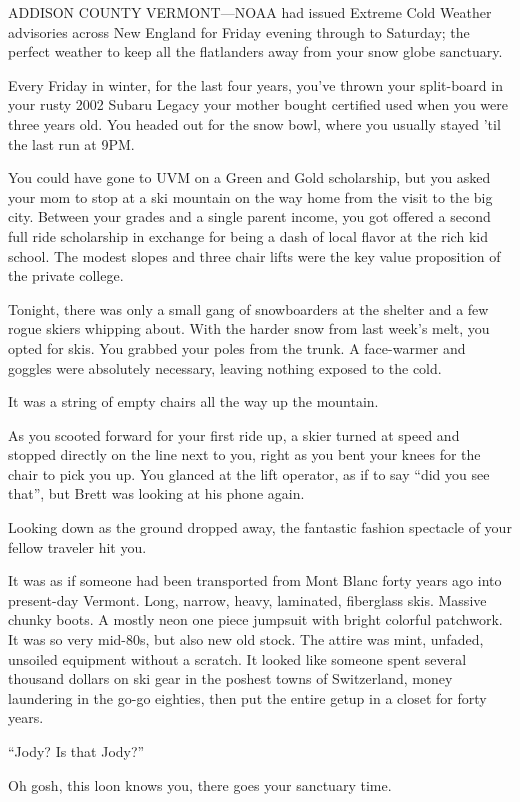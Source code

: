 \documentclass[17pt, twoside, a5paper, openright, extrafontsizes]{memoir}
\begin{document}
ADDISON COUNTY VERMONT---NOAA had issued Extreme Cold Weather advisories
across New England for Friday evening through to Saturday; the perfect
weather to keep all the flatlanders away from your snow globe sanctuary.

Every Friday in winter, for the last four years, you've thrown your
split-board in your rusty 2002 Subaru Legacy your mother bought
certified used when you were three years old. You headed out for the
snow bowl, where you usually stayed 'til the last run at 9PM.

You could have gone to UVM on a Green and Gold scholarship, but you
asked your mom to stop at a ski mountain on the way home from the visit
to the big city. Between your grades and a single parent income, you got
offered a second full ride scholarship in exchange for being a dash of
local flavor at the rich kid school. The modest slopes and three chair
lifts were the key value proposition of the private college.

Tonight, there was only a small gang of snowboarders at the shelter and
a few rogue skiers whipping about. With the harder snow from last week's
melt, you opted for skis. You grabbed your poles from the trunk. A
face-warmer and goggles were absolutely necessary, leaving nothing
exposed to the cold.

It was a string of empty chairs all the way up the mountain.

As you scooted forward for your first ride up, a skier turned at speed
and stopped directly on the line next to you, right as you bent your
knees for the chair to pick you up. You glanced at the lift operator, as
if to say ``did you see that'', but Brett was looking at his phone
again.

Looking down as the ground dropped away, the fantastic fashion spectacle
of your fellow traveler hit you.

It was as if someone had been transported from Mont Blanc forty years
ago into present-day Vermont. Long, narrow, heavy, laminated, fiberglass
skis. Massive chunky boots. A mostly neon one piece jumpsuit with bright
colorful patchwork. It was so very mid-80s, but also new old stock. The
attire was mint, unfaded, unsoiled equipment without a scratch. It
looked like someone spent several thousand dollars on ski gear in the
poshest towns of Switzerland, money laundering in the go-go eighties,
then put the entire getup in a closet for forty years.

``Jody? Is that Jody?''

Oh gosh, this loon knows you, there goes your sanctuary time.
\end{document}
